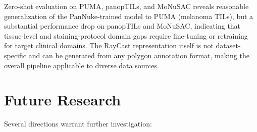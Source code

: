 Zero-shot evaluation on PUMA, panopTILs, and MoNuSAC reveals reasonable generalization of the PanNuke-trained model to
PUMA (melanoma TILs), but a substantial performance drop on panopTILs and MoNuSAC, indicating that tissue-level and
staining-protocol domain gaps require fine-tuning or retraining for target clinical domains. The RayCast representation
itself is not dataset-specific and can be generated from any polygon annotation format, making the overall pipeline
applicable to diverse data sources.

\section{Future Research}

Several directions warrant further investigation:

